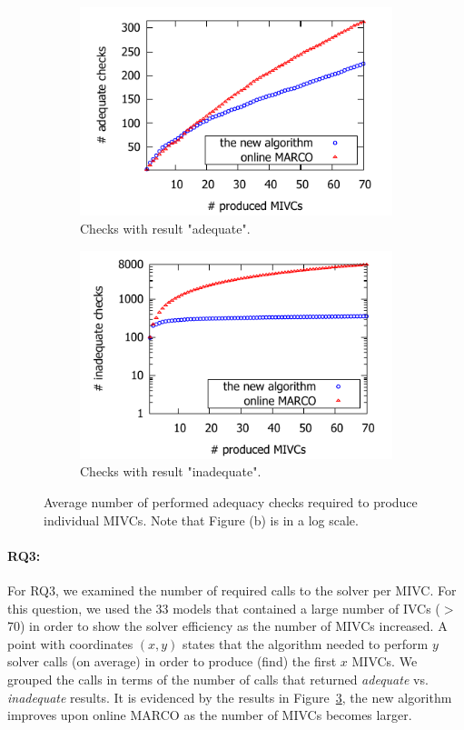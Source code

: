 \begin{figure}[!t]
\centering
\begin{subfigure}{.5\textwidth}
  \centering
  \includegraphics[scale=0.8]{./plots/adequate_checks_per_mivc_70.pdf}
  \caption{Checks with result "adequate".}
  \label{res:adequate_checks}
\end{subfigure}%
\begin{subfigure}{.5\textwidth}
  \centering
  \includegraphics[scale=0.8]{./plots/inadequate_checks_per_mivc_70.pdf}
  \caption{Checks with result "inadequate".}
  \label{res:inadequate_checks}
\end{subfigure}
\caption{Average number of performed adequacy checks required to produce individual MIVCs. Note that Figure (b) is in a log scale.}
\label{res:checks}
\end{figure}

\vspace{-10pt}
\paragraph{RQ3:}  For RQ3, we examined the number of required calls to the solver per MIVC.  For this question, we used the 33 models that contained a large number of IVCs ($>$70) in order to show the solver efficiency as the number of MIVCs increased.  A point with coordinates $(x,y)$ states that the algorithm needed to perform $y$ solver calls (on average) in order to produce (find) the first $x$ MIVCs. We grouped the calls in terms of the number of calls that returned {\em adequate} vs. {\em inadequate} results.  It is evidenced by the results in Figure~\ref{res:checks}, the new algorithm improves upon online MARCO as the number of MIVCs becomes larger. 

